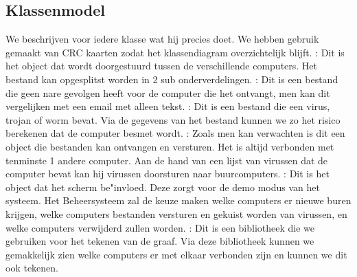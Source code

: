 \documentclass[a4paper,oneside]{report}
\begin{document}
\subsection{Klassenmodel}
We beschrijven voor iedere klasse wat hij precies doet. We hebben gebruik gemaakt van CRC kaarten zodat het klassendiagram overzichtelijk blijft.
: Dit is het object dat wordt doorgestuurd tussen de verschillende computers. Het bestand kan opgesplitst worden in 2 sub onderverdelingen.
: Dit is een bestand die geen nare gevolgen heeft voor de computer die het ontvangt, men kan dit vergelijken met een email met alleen tekst.
: Dit is een bestand die een virus, trojan of worm bevat. Via de gegevens  van het bestand kunnen we zo het risico berekenen dat de computer besmet wordt.
: Zoals men kan verwachten is dit een object die bestanden kan ontvangen en versturen. Het is altijd verbonden met tenminste 1 andere computer. Aan de hand van een lijst van virussen dat de computer bevat kan hij virussen doorsturen naar buurcomputers.
: Dit is het object dat het scherm be"invloed. Deze zorgt voor de demo modus van het systeem. Het Beheersysteem zal de keuze maken welke computers er nieuwe buren krijgen, welke computers bestanden versturen en gekuist worden van virussen, en welke computers verwijderd zullen worden.
: Dit is een bibliotheek die we gebruiken voor het tekenen van de graaf. Via deze bibliotheek kunnen we gemakkelijk zien welke computers er met elkaar verbonden zijn en kunnen we dit ook tekenen.
\eindlemma
\end{document}
